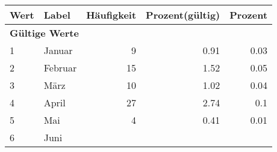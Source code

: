      \begin{longtable}{lXrrr}
     \toprule
     \textbf{Wert} & \textbf{Label} & \textbf{Häufigkeit} & \textbf{Prozent(gültig)} & \textbf{Prozent} \\
     \endhead
     \midrule
     \multicolumn{5}{l}{\textbf{Gültige Werte}}\\

     1 &
     \multicolumn{1}{X}{ Januar   } &


       \num{9} &
       \num[round-mode=places,round-precision=2]{0.91} &
         \num[round-mode=places,round-precision=2]{0.03} \\

     2 &
     \multicolumn{1}{X}{ Februar   } &


       \num{15} &
       \num[round-mode=places,round-precision=2]{1.52} &
         \num[round-mode=places,round-precision=2]{0.05} \\

     3 &
     \multicolumn{1}{X}{ März   } &


       \num{10} &
       \num[round-mode=places,round-precision=2]{1.02} &
         \num[round-mode=places,round-precision=2]{0.04} \\

     4 &
     \multicolumn{1}{X}{ April   } &


       \num{27} &
       \num[round-mode=places,round-precision=2]{2.74} &
         \num[round-mode=places,round-precision=2]{0.1} \\

     5 &
     \multicolumn{1}{X}{ Mai   } &


       \num{4} &
       \num[round-mode=places,round-precision=2]{0.41} &
         \num[round-mode=places,round-precision=2]{0.01} \\

     6 &
     \multicolumn{1}{X}{ Juni   } &



\end{longtable}
